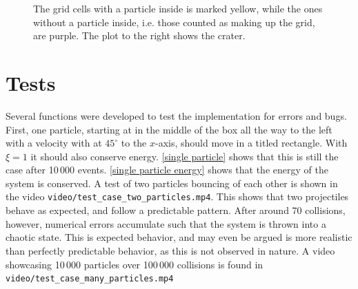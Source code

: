 \documentclass{article}
\begin{document}
\begin{figure}[H]
\begin{subfigure}{.59\textwidth}
        \end{subfigure}
        \caption{The grid cells with a particle inside is marked yellow, while the ones without a particle inside, i.e.
        those counted as making up the grid, are purple.
        The plot to the right shows the crater.}
        \label{crater}
    \end{figure}


    \section*{Tests}

    Several functions were developed to test the implementation for errors and bugs.
    First, one particle, starting at in the middle of the box all the way to the left with a velocity with at $45^\circ$ to the $x$-axis, should move in a titled rectangle.
    With $\xi=1$ it should also conserve energy.
    \autoref{single particle} shows that this is still the case after 10\,000 events.
    \autoref{single particle energy} shows that the energy of the system is conserved.
    A test of two particles bouncing of each other is shown in the video \verb|video/test_case_two_particles.mp4|.
    This shows that two projectiles behave as expected, and follow a predictable pattern.
    After around 70 collisions, however, numerical errors accumulate such that the system is thrown into a chaotic state.
    This is expected behavior, and may even be argued is more realistic than perfectly predictable behavior, as this is not observed in nature.
    A video showcasing 10\,000 particles over 100\,000 collisions is found in \verb|video/test_case_many_particles.mp4|
\end{document}
